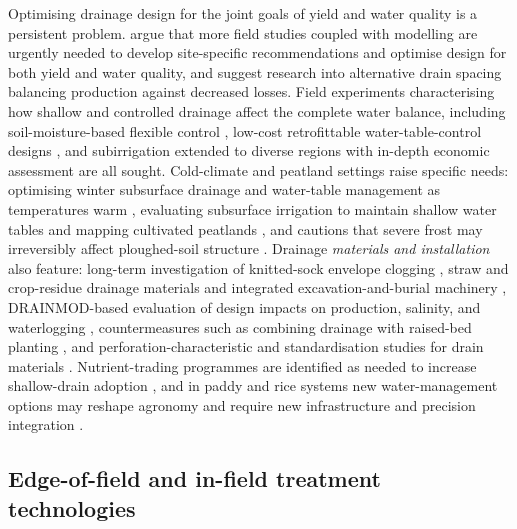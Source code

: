 Optimising drainage design for the joint goals of yield and water quality is a persistent problem. \textcite{Kladivko2021} argue that more field studies coupled with modelling are urgently needed to develop site-specific recommendations and optimise design for both yield and water quality, and \textcite{Zhao2016} suggest research into alternative drain spacing balancing production against decreased losses. Field experiments characterising how shallow and controlled drainage affect the complete water balance, including soil-moisture-based flexible control \parencite{Singh2006b,Singh2007b}, low-cost retrofittable water-table-control designs \parencite{Dinnes2002}, and subirrigation extended to diverse regions with in-depth economic assessment \parencite{Gunn2019,Baker2004} are all sought. Cold-climate and peatland settings raise specific needs: optimising winter subsurface drainage and water-table management as temperatures warm \parencite{Li2025}, evaluating subsurface irrigation to maintain shallow water tables and mapping cultivated peatlands \parencite{Läpikivi2025}, and cautions that severe frost may irreversibly affect ploughed-soil structure \parencite{STEINHARDT1974}. Drainage \emph{materials and installation} also feature: long-term investigation of knitted-sock envelope clogging \parencite{Ghane2022}, straw and crop-residue drainage materials and integrated excavation-and-burial machinery \parencite{Qi2025b,Lu2018}, DRAINMOD-based evaluation of design impacts on production, salinity, and waterlogging \parencite{Ellafi2021}, countermeasures such as combining drainage with raised-bed planting \parencite{Takeshima2023}, and perforation-characteristic and standardisation studies for drain materials \parencite{Zhang2025b,ASGHAR1995}. Nutrient-trading programmes are identified as needed to increase shallow-drain adoption \parencite{Ghane2021b}, and in paddy and rice systems new water-management options may reshape agronomy and require new infrastructure and precision integration \parencite{DarziNaftchali2014,Jung2024,Hashemi2020}.

\subsection{Edge-of-field and in-field treatment technologies}

